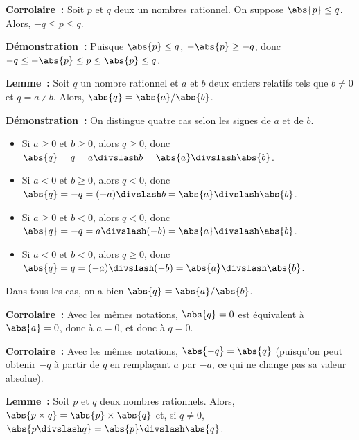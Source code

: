     \done

\medskip

\noindent\textbf{Corrolaire :} Soit $p$ et $q$ deux un nombres rationnel.
    On suppose $\abs{p} \leq q$.
    Alors, $-q \leq p \leq q$.

\medskip

\noindent\textbf{Démonstration :} 
    Puisque $\abs{p} \leq q$, $-\abs{p} \geq -q$, donc $-q \leq -\abs{p} \leq p \leq \abs{p} \leq q$. 

    \done

\medskip

\noindent\textbf{Lemme :} Soit $q$ un nombre rationnel et $a$ et $b$ deux entiers relatifs tels que $b \neq 0$ et $q = a \divslash b$.
    Alors, $\abs{q} = \abs{a} / \abs{b}$.

\medskip

\noindent\textbf{Démonstration :} On distingue quatre cas selon les signes de $a$ et de $b$.
    \begin{itemize}[nosep]
        \item Si $a \geq 0$ et $b \geq 0$, alors $q \geq 0$, donc $\abs{q} = q = a \divslash b = \abs{a} \divslash \abs{b}$.
        \item Si $a < 0$ et $b \geq 0$, alors $q < 0$, donc $\abs{q} = - q = (-a) \divslash b = \abs{a} \divslash \abs{b}$.
        \item Si $a \geq 0$ et $b < 0$, alors $q < 0$, donc $\abs{q} = - q = a \divslash (-b) = \abs{a} \divslash \abs{b}$.
        \item Si $a < 0$ et $b < 0$, alors $q \geq 0$, donc $\abs{q} = q = (-a) \divslash (-b) = \abs{a} \divslash \abs{b}$.
    \end{itemize}
    Dans tous les cas, on a bien $\abs{q} = \abs{a} / \abs{b}$.

    \done

\medskip

\noindent\textbf{Corrolaire :} Avec les mêmes notations, $\abs{q} = 0$ est équivalent à $\abs{a} = 0$, donc à $a = 0$, et donc à $q = 0$.

\medskip

\noindent\textbf{Corrolaire :} Avec les mêmes notations, $\abs{-q} = \abs{q}$ (puisqu'on peut obtenir $-q$ à partir de $q$ en remplaçant $a$ par $-a$, ce qui ne change pas sa valeur absolue).

\medskip

\noindent\textbf{Lemme :} Soit $p$ et $q$ deux nombres rationnels.
    Alors, $\abs{p \times q} = \abs{p} \times \abs{q}$ et, si $q \neq 0$, $\abs{p \divslash q} = \abs{p} \divslash \abs{q}$.

